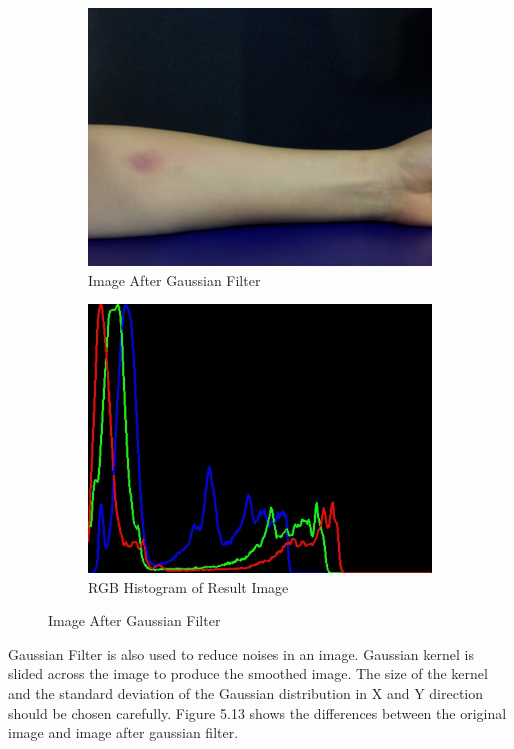 \begin{figure}[!h]
\begin{subfigure}{.5\textwidth}
  \includegraphics[scale=0.23]{img/gaussian}
  \caption{Image After Gaussian Filter}
  \label{fig:sub2}
\end{subfigure}%
\begin{subfigure}{.5\textwidth}
  \centering
  \includegraphics[scale=0.43]{img/gaussianrgb}
  \caption{RGB Histogram of Result Image}
  \label{fig:sub1}
\end{subfigure}
\label{fig:test}
\caption{Image After Gaussian Filter}
\end{figure}

Gaussian Filter is also used to reduce noises in an image. Gaussian kernel is slided across the image to produce the smoothed image. The size of the kernel and the standard deviation of the Gaussian distribution in X and Y direction should be chosen carefully. Figure 5.13 shows the differences between the original image and image after gaussian filter.

